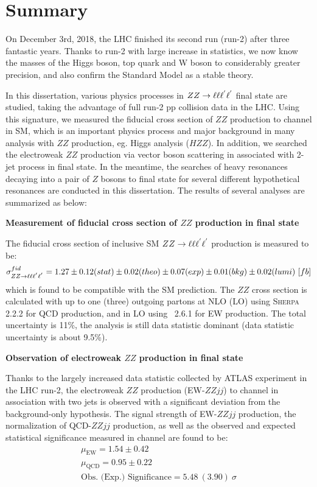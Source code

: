 \chapter{Summary}

On December 3rd, 2018, the LHC finished its second run (run-2) after three fantastic years.
Thanks to run-2 with large increase in statistics, we now know the masses of the Higgs boson, top quark and W boson to considerably greater precision,
and also confirm the Standard Model as a stable theory.

In this dissertation, various physics processes in $ZZ \rightarrow \ell\ell\ell^{'}\ell^{'}$ final state are studied, taking the advantage of full run-2 pp collision data in the LHC.
Using this signature, we measured the fiducial cross section of $ZZ$ production to \lllljj channel in SM, which is an important physics process and major background in many analysis with $ZZ$ production, eg. Higgs analysis ($HZZ$).
In addition, we searched the electroweak $ZZ$ production via vector boson scattering in associated with 2-jet process in \llll final state.
In the meantime, the searches of heavy resonances decaying into a pair of $Z$ bosons to \llll final state for several different hypothetical resonances are conducted in this dissertation.
The results of several analyses are summarized as below:

\textbf{Measurement of fiducial cross section of $ZZ$ production in \lllljj final state}

The fiducial cross section of inclusive SM $ZZ \rightarrow \ell\ell\ell^{'}\ell^{'}$ production is measured to be:
\begin{equation}
	\sigma^{fid}_{ZZ\rightarrow\ell\ell\ell^{'}\ell^{'}} = 1.27 \pm 0.12 (stat) \pm 0.02 (theo) \pm 0.07 (exp) \pm 0.01 (bkg) \pm 0.02 (lumi)~ [fb]
\end{equation}
which is found to be compatible with the SM prediction.
The $ZZ$ cross section is calculated with up to one (three) outgoing partons at NLO (LO) using \textsc{Sherpa} 2.2.2 for QCD production,
and in LO using \MGMCatNLO~2.6.1 for EW production.
The total uncertainty is 11\%, the analysis is still data statistic dominant (data statistic uncertainty is about 9.5\%).

\textbf{Observation of electroweak $ZZ$ production in \lllljj final state}

Thanks to the largely increased data statistic collected by ATLAS experiment in the LHC run-2, 
the electroweak $ZZ$ production (EW-$ZZjj$) to \llll channel in association with two jets is observed with a significant deviation from the background-only hypothesis.
The signal strength of EW-$ZZjj$ production, the normalization of QCD-$ZZjj$ production, as well as the observed and expected statistical significance measured in \lllljj channel are found to be:
\begin{equation}
\begin{split}
	\mu_{\mathrm{EW}} = 1.54 \pm 0.42 \\
	\mu_{\mathrm{QCD}} = 0.95 \pm 0.22 \\
	\text{Obs. (Exp.) Significance} = 5.48~(3.90)~\sigma
\end{split}
\end{equation}

